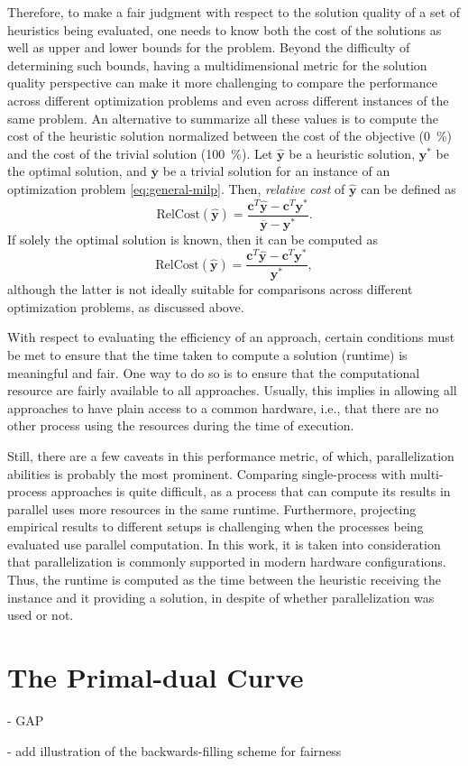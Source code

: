 Therefore, to make a fair judgment with respect to the solution quality of a set of heuristics being evaluated, one needs to know both the cost of the solutions as well as upper and lower bounds for the problem.
Beyond the difficulty of determining such bounds, having a multidimensional metric for the solution quality perspective can make it more challenging to compare the performance across different optimization problems and even across different instances of the same problem.
An alternative to summarize all these values is to compute the cost of the heuristic solution normalized between the cost of the objective (0~\%) and the cost of the trivial solution (100~\%).
Let $\hat{\bm{y}}$ be a heuristic solution, $\bm{y}^*$ be the optimal solution, and $\overline{\bm{y}}$ be a trivial solution for an instance of an optimization problem \eqref{eq:general-milp}.
Then, \emph{relative cost} of $\hat{\bm{y}}$ can be defined as
\begin{equation}
    \text{RelCost}(\hat{\bm{y}}) = \frac{\bm{c}^{T} \hat{\bm{y}} - \bm{c}^{T} \bm{y}^*}{\overline{\bm{y}} - \bm{y}^*}
.\end{equation}
If solely the optimal solution is known, then it can be computed as
\begin{equation}
    \text{RelCost}(\hat{\bm{y}}) = \frac{\bm{c}^{T} \hat{\bm{y}} - \bm{c}^{T} \bm{y}^*}{\bm{y}^*}
,\end{equation}
although the latter is not ideally suitable for comparisons across different optimization problems, as discussed above.

With respect to evaluating the efficiency of an approach, certain conditions must be met to ensure that the time taken to compute a solution (runtime) is meaningful and fair.
One way to do so is to ensure that the computational resource are fairly available to all approaches.
Usually, this implies in allowing all approaches to have plain access to a common hardware, i.e., that there are no other process using the resources during the time of execution.

Still, there are a few caveats in this performance metric, of which, parallelization abilities is probably the most prominent.
Comparing single-process with multi-process approaches is quite difficult, as a process that can compute its results in parallel uses more resources in the same runtime. 
Furthermore, projecting empirical results to different setups is challenging when the processes being evaluated use parallel computation. 
In this work, it is taken into consideration that parallelization is commonly supported in modern hardware configurations.
Thus, the runtime is computed as the time between the heuristic receiving the instance and it providing a solution, in despite of whether parallelization was used or not.

\section{The Primal-dual Curve}\label{sec:primal-dual-curve}


- GAP

- add illustration of the backwards-filling scheme for fairness

